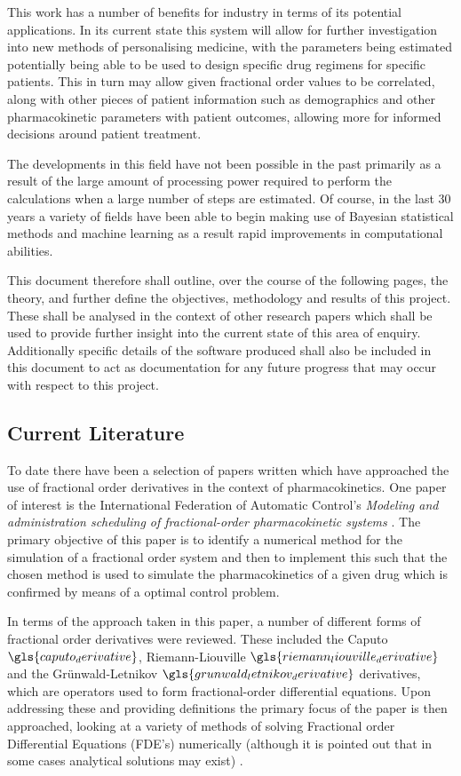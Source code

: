 This work has a number of benefits for industry in terms of its potential applications. In its current state this system will allow for further investigation into new methods of personalising medicine, with the parameters being estimated potentially being able to be used to design specific drug regimens for specific patients. This in turn may allow given fractional order values to be correlated, along with other pieces of patient information such as demographics and other pharmacokinetic parameters with patient outcomes, allowing more for informed decisions around patient treatment.

The developments in this field have not been possible in the past primarily as a result of the large amount of processing power required to perform the calculations when a large number of steps are estimated. Of course, in the last 30 years a variety of fields have been able to begin making use of Bayesian statistical methods and machine learning as a result rapid improvements in computational abilities.

This document therefore shall outline, over the course of the following pages, the theory, and further define the objectives, methodology and results of this project. These shall be analysed in the context of other research papers which shall be used to provide further insight into the current state of this area of enquiry. Additionally specific details of the software produced shall also be included in this document to act as documentation for any future progress that may occur with respect to this project.

\subsection{Current Literature} \label{current_literature}

To date there have been a selection of papers written which have approached the use of fractional order derivatives in the context of pharmacokinetics. One paper of interest is the International Federation of Automatic Control's \textit{Modeling and administration scheduling of fractional-order pharmacokinetic systems} \cite{Modeling_and_administration_scheduling}. The primary objective of this paper is to identify a numerical method for the simulation of a fractional order system and then to implement this such that the chosen method is used to simulate the pharmacokinetics of a given drug which is confirmed by means of a optimal control problem. 

In terms of the approach taken in this paper, a number of different forms of fractional order derivatives were reviewed. These included the Caputo $\gls{caputo_derivative}$, Riemann-Liouville $\gls{riemann_liouville_derivative}$ and the Gr\"{u}nwald-Letnikov $\gls{grunwald_letnikov_derivative}$ derivatives, which are operators used to form fractional-order differential equations. Upon addressing these and providing definitions the primary focus of the paper is then approached, looking at a variety of methods of solving Fractional order Differential Equations (FDE's) numerically (although it is pointed out that in some cases analytical solutions may exist) \cite{garrappa2015numerical}. 

